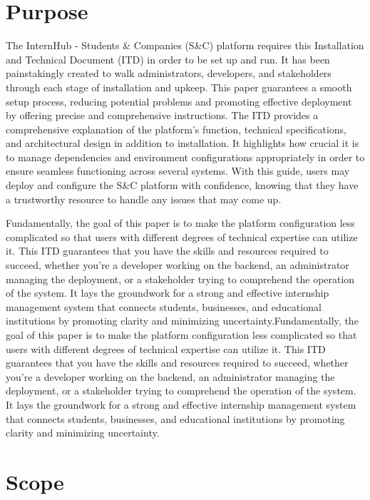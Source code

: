 \section{Purpose}
\label{sec:purpose}%
The InternHub - Students \& Companies (S\&C) platform requires this Installation and Technical Document (ITD) in order to be set up and run. It has been painstakingly created to walk administrators, developers, and stakeholders through each stage of installation and upkeep. This paper guarantees a smooth setup process, reducing potential problems and promoting effective deployment by offering precise and comprehensive instructions.
The ITD provides a comprehensive explanation of the platform's function, technical specifications, and architectural design in addition to installation. It highlights how crucial it is to manage dependencies and environment configurations appropriately in order to ensure seamless functioning across several systems. With this guide, users may deploy and configure the S&C platform with confidence, knowing that they have a trustworthy resource to handle any issues that may come up.

Fundamentally, the goal of this paper is to make the platform configuration less complicated so that users with different degrees of technical expertise can utilize it. This ITD guarantees that you have the skills and resources required to succeed, whether you're a developer working on the backend, an administrator managing the deployment, or a stakeholder trying to comprehend the operation of the system. It lays the groundwork for a strong and effective internship management system that connects students, businesses, and educational institutions by promoting clarity and minimizing uncertainty.Fundamentally, the goal of this paper is to make the platform configuration less complicated so that users with different degrees of technical expertise can utilize it. This ITD guarantees that you have the skills and resources required to succeed, whether you're a developer working on the backend, an administrator managing the deployment, or a stakeholder trying to comprehend the operation of the system. It lays the groundwork for a strong and effective internship management system that connects students, businesses, and educational institutions by promoting clarity and minimizing uncertainty.


\section{Scope}
\label{subsec:scope}%
\setcounter{g}{1}
\newcommand{\cg}{\theg\stepcounter{g}}

